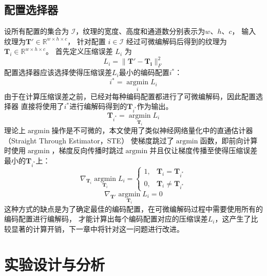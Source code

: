 \subsection{配置选择器}

设所有配置的集合为 $\mathcal{I}$，纹理的宽度、高度和通道数分别表示为$w$、$h$、$c$，
输入纹理为$\mathbf{T}'\in \mathbb{R}^{w\times h\times c}$，
针对配置 $i\in\mathcal{I}$ 经过可微编解码后得到的纹理为 $\mathbf{T}_i\in \mathbb{R}^{w\times h\times c}$。
首先定义压缩误差 $L_i$ 为
\begin{equation}
    L_i=\|\mathbf{T'}-\mathbf{T_i}\|_F^2
\end{equation}
配置选择器应该选择使得压缩误差$L_i$最小的编码配置$i^*$：
\begin{equation}
    i^*=\mathop{\arg\min}\limits_{i} L_i
\end{equation}
由于在计算压缩误差之前，已经对每种编码配置都进行了可微编解码，因此配置选择器
直接将使用了$i^*$进行编解码得到的$\mathbf{T}_{i^*}$作为输出。
\begin{equation}
    \mathbf{T}_{i^*}=\mathop{\arg\min}\limits_{\mathbf{T}_i} L_i
\end{equation}
理论上$\mathop{\arg\min}$操作是不可微的，本文使用了类似神经网络量化中的直通估计器（Straight Through Estimator，STE）\cite{bengio2013estimating}
使梯度跳过了$\mathop{\arg\min}$函数，即前向计算时使用$\mathop{\arg\min}$，梯度反向传播时跳过$\mathop{\arg\min}$并且仅让梯度传播至使得压缩误差最小的$\mathbf{T}_{i^*}$上：
\begin{equation}
    \nabla_{\mathbf{T}_i}{\mathop{\arg\min}\limits_{\mathbf{T}_i} L_i} =\left\{\begin{matrix}
        1,& \mathbf{T}_{i}=\mathbf{T}_{i^*}
        \\0,& \mathbf{T}_{i} \ne \mathbf{T}_{i^*}
        \end{matrix}\right.
\end{equation}
\begin{equation}
    \nabla_{\mathbf{T}'}{\mathop{\arg\min}\limits_{\mathbf{T}_i} L_i}=0
\end{equation}
这种方式的缺点是为了确定最佳的编码配置，在可微编解码过程中需要使用所有的编码配置进行编解码，
才能计算出每个编码配置对应的压缩误差$L_i$，这产生了比较显著的计算开销，下一章中将针对这一问题进行改进。



\section{实验设计与分析}

